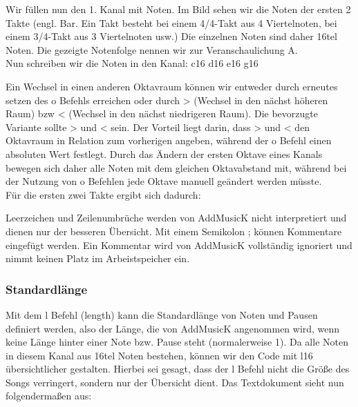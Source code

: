 \clearpage

Wir füllen nun den 1. Kanal mit Noten. Im Bild sehen wir die Noten der ersten 2 Takte (engl. Bar. Ein Takt besteht bei einem 4/4-Takt aus 4 Viertelnoten, bei einem 3/4-Takt aus 3 Viertelnoten usw.) Die einzelnen Noten sind daher 16tel Noten. Die gezeigte Notenfolge nennen wir zur Veranschaulichung A. \\
Nun schreiben wir die Noten in den Kanal: c16 d16 e16 g16

\bigskip

Ein Wechsel in einen anderen Oktavraum können wir entweder durch erneutes setzen des o Befehls erreichen oder durch > (Wechsel in den nächst höheren Raum) bzw < (Wechsel in den nächst niedrigeren Raum). Die bevorzugte Variante sollte > und < sein. Der Vorteil liegt darin, dass > und < den Oktavraum in Relation zum vorherigen angeben, während der o Befehl einen absoluten Wert festlegt. Durch das Ändern der ersten Oktave eines Kanals bewegen sich daher alle Noten mit dem gleichen Oktavabstand mit, während bei der Nutzung von o Befehlen jede Oktave manuell geändert werden müsste. \\
Für die ersten zwei Takte ergibt sich dadurch:

\medskip



\medskip

Leerzeichen und Zeilenumbrüche werden von AddMusicK nicht interpretiert und dienen nur der besseren Übersicht.
Mit einem Semikolon ; können Kommentare eingefügt werden. Ein Kommentar wird von AddMusicK vollständig ignoriert und nimmt keinen Platz im Arbeistspeicher ein.

\subsubsection{Standardlänge}

Mit dem l Befehl (length) kann die Standardlänge von Noten und Pausen definiert werden, also der Länge, die von AddMusicK angenommen wird, wenn keine Länge hinter einer Note bzw. Pause steht (normalerweise 1). Da alle Noten in diesem Kanal aus 16tel Noten bestehen, können wir den Code mit l16 übersichtlicher gestalten. Hierbei sei gesagt, dass der l Befehl nicht die Größe des Songs verringert, sondern nur der Übersicht dient. Das Textdokument sieht nun folgendermaßen aus:

\clearpage


